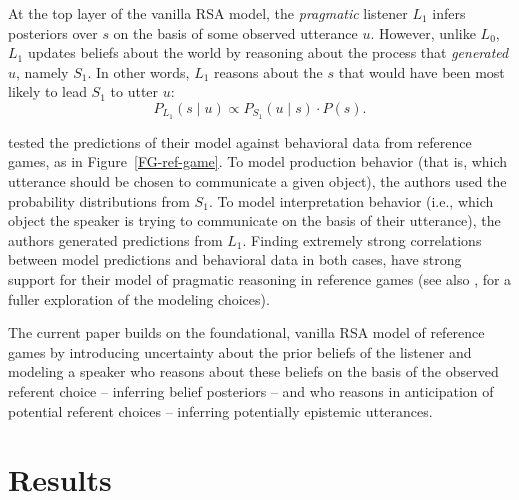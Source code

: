 \documentclass[10pt,a4paper]{article}
\begin{document}
At the top layer of the vanilla RSA model, the \emph{pragmatic} listener $L_1$ infers posteriors over $s$ on the basis of some observed utterance $u$.
However, unlike $L_0$, $L_1$ updates beliefs about the world by reasoning about the process that \emph{generated} $u$, namely $S_1$.
In other words, $L_1$ reasons about the $s$ that would have been most likely to lead $S_1$ to utter $u$:
$$P_{L_{1}}(s \mid u) \propto P_{S_{1}}(u \mid s) \cdot P(s).$$

 tested the predictions of their model against behavioral data from reference games, as in Figure~\ref{FG-ref-game}.
To model production behavior (that is, which utterance should be chosen to communicate a given object), the authors used the probability distributions from $S_1$.
To model interpretation behavior (i.e., which object the speaker is trying to communicate on the basis of their utterance), the authors generated predictions from $L_1$.
Finding extremely strong correlations between model predictions and behavioral data in both cases, \citeauthor{frankgoodman2012} have strong support for their model of pragmatic reasoning in reference games (see also , for a fuller exploration of the modeling choices).


The current paper builds on the foundational, vanilla RSA model of reference games by introducing uncertainty about the prior beliefs of the listener and modeling a speaker who reasons about these beliefs on the basis of the observed referent choice -- inferring belief posteriors -- and who reasons in anticipation of potential referent choices -- inferring potentially epistemic utterances. 


\section*{Results}
\end{document}
